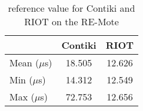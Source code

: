 \begin{table}[!ht]
  \centering
  \begin{tabular}{l|c|c}
       & Contiki & RIOT \\ \hline
  Mean ($\mu$s) & 18.505 & 12.626 \\
  Min  ($\mu$s) & 14.312 & 12.549 \\
  Max  ($\mu$s) & 72.753   & 12.656
  \end{tabular}
  \caption{reference value for Contiki and RIOT on the RE-Mote}
  \label{tab:reference-value-remote}
  \end{table}